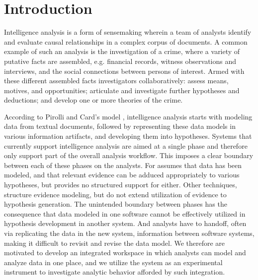 \section{Introduction}\label{introduction}

Intelligence analysis is a form of sensemaking wherein a team of analysts
identify and evaluate causal relationships in a complex corpus of documents. A
common example of such an analysis is the investigation of a crime, where a variety of putative facts are assembled, e.g.
financial records, witness observations and interviews, and the social
connections between persons of interest. Armed with these different assembled facts
 investigators collaboratively: assess means, motives,
and opportunities; articulate and investigate further hypotheses and deductions;
and develop one or more theories of the crime.


According to Pirolli and Card's model \cite{Pirolli2005}, intelligence analysis
starts with modeling data from textual documents, followed by representing these
data models in various information artifacts, and developing them into
hypotheses.  Systems that currently support intelligence analysis are aimed at a
single phase and therefore only support part of the overall analysis workflow.
This imposes a clear boundary between each of these phases on the analysts. For
 assumes that data has
been modeled, and that relevant evidence can be adduced appropriately to various
hypotheses, but provides no structured support for either. Other techniques,
 structure evidence
modeling, but do not extend utilization of evidence to hypothesis generation.
The unintended boundary between phases has the consequence that data modeled in
one software cannot be effectively utilized in hypothesis development in another
system. And analysts have to handoff, often via replicating the data in the new
system, information between software systems, making it difficult to revisit and
revise the data model. We therefore are motivated to develop an integrated
workspace in which analysts can model and analyze data in one place, and we
utilize the system as an experimental instrument to investigate analytic
behavior afforded by such integration.

